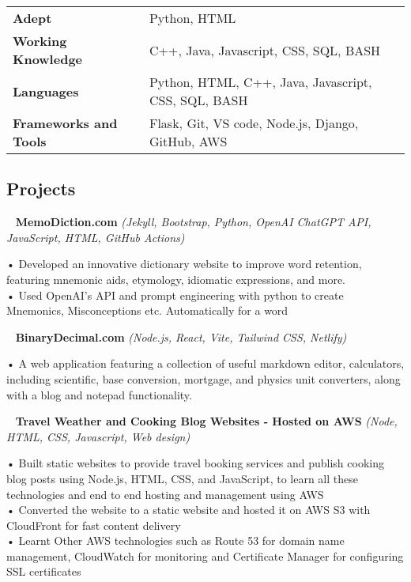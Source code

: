 \documentclass[11pt,letterpaper]{article}
\newcommand{\normalsizesection}{\normalsize}
\newcommand{\smallersection}{\small}
\newcommand{\sectionbox}[1]{%
    \vspace{0.2em}
    \begin{tcolorbox}[
        colback=sectionbg,
        colframe=sectionbg,
        width=\textwidth,
        left=5pt,
        right=5pt,
        top=2pt,
        bottom=2pt,
        boxrule=0pt,
        arc=0pt,
        boxsep=0pt,
    ]
    \section*{#1}
    \end{tcolorbox}
    \vspace{-0.3em}
}
\newcommand{\tech}[1]{\textit{(#1)}}
\newenvironment{projectentry}{%
    \leftskip=0.5cm
    \par\noindent
}{\par\leftskip=0cm\vspace{-2pt}}
\newenvironment{projectdesc}{%
    \leftskip=1.0cm
    \footnotesize
    \par\noindent
}{\par\leftskip=0cm\smallersection\vspace{-3pt}}
\newcommand{\projicon}[1]{%
    {\small\color{gray!70}#1}~%
}
\begin{document}
\begin{tabularx}{\textwidth}{@{} l X @{}}
\textbf{Adept} & Python, HTML \\[2pt]
\textbf{Working Knowledge} & C++, Java, Javascript, CSS, SQL, BASH \\[2pt]
\textbf{Languages} & Python, HTML, C++, Java, Javascript, CSS, SQL, BASH \\[2pt]
\textbf{Frameworks and Tools} & Flask, Git, VS code, Node.js, Django, GitHub, AWS
\end{tabularx}

\normalsizesection

\sectionbox{Projects}
\smallersection

\begin{projectentry}
    \projicon{\faGlobe} \textbf{MemoDiction.com} \tech{Jekyll, Bootstrap, Python, OpenAI ChatGPT API, JavaScript, HTML, GitHub Actions}
\end{projectentry}

\begin{projectdesc}
    • Developed an innovative dictionary website to improve word retention, featuring mnemonic aids, etymology, idiomatic expressions, and more.\\[1pt]
    • Used OpenAI's API and prompt engineering with python to create Mnemonics, Misconceptions etc. Automatically for a word
\end{projectdesc}

\begin{projectentry}
    \projicon{\faCalculator} \textbf{BinaryDecimal.com} \tech{Node.js, React, Vite, Tailwind CSS, Netlify}
\end{projectentry}

\begin{projectdesc}
    • A web application featuring a collection of useful markdown editor, calculators, including scientific, base conversion, mortgage, and physics unit converters, along with a blog and notepad functionality.
\end{projectdesc}

\begin{projectentry}
    \projicon{\faCloud} \textbf{Travel Weather and Cooking Blog Websites - Hosted on AWS} \tech{Node, HTML, CSS, Javascript, Web design}
\end{projectentry}

\begin{projectdesc}
    • Built static websites to provide travel booking services and publish cooking blog posts using Node.js, HTML, CSS, and JavaScript, to learn all these technologies and end to end hosting and management using AWS\\[1pt]
    • Converted the website to a static website and hosted it on AWS S3 with CloudFront for fast content delivery\\[1pt]
    • Learnt Other AWS technologies such as Route 53 for domain name management, CloudWatch for monitoring and Certificate Manager for configuring SSL certificates
\end{projectdesc}
\end{document}
